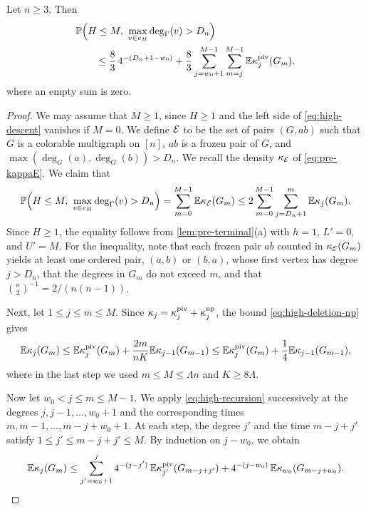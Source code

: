 \begin{proposition}\label{prop:high-descent}
Let $n \ge 3$. Then
\begin{equation}\label{eq:high-descent}
\begin{split}
&\mathbb P \Bigl( H \le M, \ \max_{v \in e_H} \deg_\Gamma(v) > D_n \Bigr)\\
&\qquad \le \frac{8}{3} \, 4^{-(D_n + 1 - w_0)} + \frac{8}{3} \sum_{j = w_0 + 1}^{M - 1} \sum_{m = j}^{M - 1} \mathbb E \kappa_j^{\rm piv}(G_m),
\end{split}
\end{equation}
where an empty sum is zero.
\end{proposition}

\begin{proof}
We may assume that $M \ge 1$, since $H \ge 1$ and the left side of \eqref{eq:high-descent} vanishes if $M = 0$. We define $\mathcal E$ to be the set of pairs $(G, ab)$ such that $G$ is a colorable multigraph on $[n]$, $ab$ is a frozen pair of $G$, and $\max(\deg_G(a), \deg_G(b)) > D_n$. We recall the density $\kappa_\mathcal E$ of \eqref{eq:pre-kappaE}. We claim that
\begin{equation}\label{eq:high-descent-1}
\mathbb P \Bigl( H \le M, \ \max_{v \in e_H} \deg_\Gamma(v) > D_n \Bigr) = \sum_{m = 0}^{M - 1} \mathbb E \kappa_\mathcal E(G_m) \le 2 \sum_{m = 0}^{M - 1} \sum_{j = D_n + 1}^{m} \mathbb E \kappa_j(G_m).
\end{equation}
Since $H \ge 1$, the equality follows from \cref{lem:pre-terminal}(a) with $h = 1$, $L' = 0$, and $U' = M$. For the inequality, note that each frozen pair $ab$ counted in $\kappa_\mathcal E(G_m)$ yields at least one ordered pair, $(a, b)$ or $(b, a)$, whose first vertex has degree $j > D_n$, that the degrees in $G_m$ do not exceed $m$, and that $\binom{n}{2}^{-1} = 2/(n(n - 1))$.

Next, let $1 \le j \le m \le M$. Since $\kappa_j = \kappa_j^{\rm piv} + \kappa_j^{\rm np}$, the bound \eqref{eq:high-deletion-np} gives
\begin{equation}\label{eq:high-recursion}
\mathbb E \kappa_j(G_m) \le \mathbb E \kappa_j^{\rm piv}(G_m) + \frac{2m}{nK} \mathbb E \kappa_{j - 1}(G_{m - 1}) \le \mathbb E \kappa_j^{\rm piv}(G_m) + \frac{1}{4} \mathbb E \kappa_{j - 1}(G_{m - 1}),
\end{equation}
where in the last step we used $m \le M \le \Lambda n$ and $K \ge 8 \Lambda$.

Now let $w_0 < j \le m \le M - 1$. We apply \eqref{eq:high-recursion} successively at the degrees $j, j - 1, \dots, w_0 + 1$ and the corresponding times $m, m - 1, \dots, m - j + w_0 + 1$. At each step, the degree $j'$ and the time $m - j + j'$ satisfy $1 \le j' \le m - j + j' \le M$. By induction on $j - w_0$, we obtain
\begin{equation}\label{eq:high-iterate}
\mathbb E \kappa_j(G_m) \le \sum_{j' = w_0 + 1}^{j} 4^{-(j - j')} \, \mathbb E \kappa_{j'}^{\rm piv}(G_{m - j + j'}) + 4^{-(j - w_0)} \, \mathbb E \kappa_{w_0}(G_{m - j + w_0}).
\end{equation}


\end{proof}
